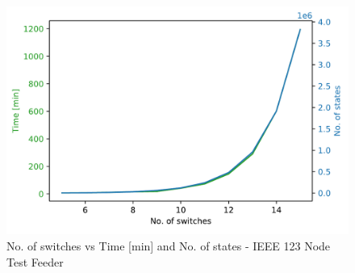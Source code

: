 \begin{figure}
    \includegraphics[scale=0.5]{_conclusions/fig/swtimestates.pdf}
    \centering
    \caption{No. of switches vs Time [min] and No. of states - IEEE 123 Node Test Feeder}
    \label{ch-conclusions:fig:123_swtimestates}
\end{figure}